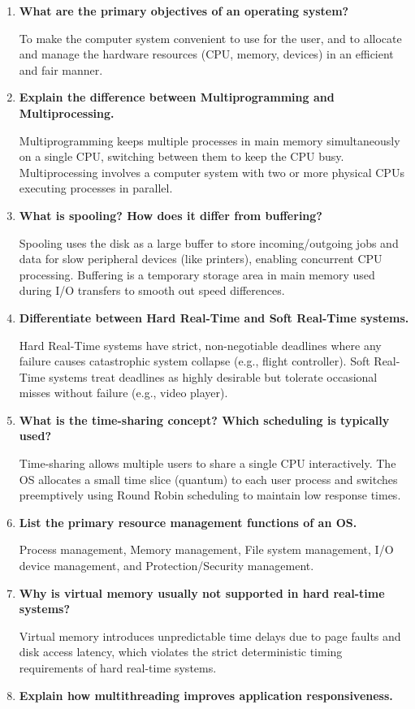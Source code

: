 \documentclass[12pt,a4paper]{article}
\newcommand{\Q}[1]{\textbf{#1}\par\noindent\ignorespaces}
\begin{document}
\begin{tcolorbox}[exambox, title={\textbf{Frequently Asked / Viva Questions}}]
\begin{enumerate}[topsep=0pt, label=\textbf{Q\arabic*.}, itemsep=5pt]
  \item \Q{What are the primary objectives of an operating system?}
    To make the computer system convenient to use for the user, and to allocate and manage the hardware resources (CPU, memory, devices) in an efficient and fair manner.
  \item \Q{Explain the difference between Multiprogramming and Multiprocessing.}
    Multiprogramming keeps multiple processes in main memory simultaneously on a single CPU, switching between them to keep the CPU busy. Multiprocessing involves a computer system with two or more physical CPUs executing processes in parallel.
  \item \Q{What is spooling? How does it differ from buffering?}
    Spooling uses the disk as a large buffer to store incoming/outgoing jobs and data for slow peripheral devices (like printers), enabling concurrent CPU processing. Buffering is a temporary storage area in main memory used during I/O transfers to smooth out speed differences.
  \item \Q{Differentiate between Hard Real-Time and Soft Real-Time systems.}
    Hard Real-Time systems have strict, non-negotiable deadlines where any failure causes catastrophic system collapse (e.g., flight controller). Soft Real-Time systems treat deadlines as highly desirable but tolerate occasional misses without failure (e.g., video player).
  \item \Q{What is the time-sharing concept? Which scheduling is typically used?}
    Time-sharing allows multiple users to share a single CPU interactively. The OS allocates a small time slice (quantum) to each user process and switches preemptively using Round Robin scheduling to maintain low response times.
  \item \Q{List the primary resource management functions of an OS.}
    Process management, Memory management, File system management, I/O device management, and Protection/Security management.
  \item \Q{Why is virtual memory usually not supported in hard real-time systems?}
    Virtual memory introduces unpredictable time delays due to page faults and disk access latency, which violates the strict deterministic timing requirements of hard real-time systems.
  \item \Q{Explain how multithreading improves application responsiveness.}

\end{enumerate}
\end{tcolorbox}
\end{document}
